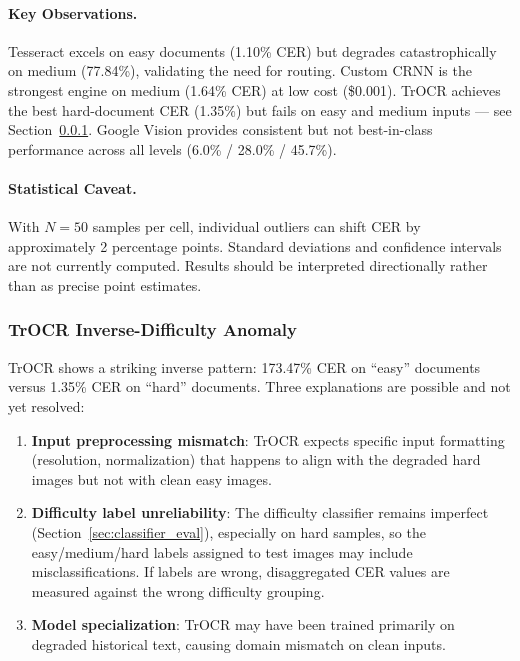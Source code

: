 \documentclass[12pt,a4paper]{article}
\begin{document}
\paragraph{Key Observations.}
Tesseract excels on easy documents (1.10\% CER) but degrades
catastrophically on medium (77.84\%), validating the need for
routing. Custom CRNN is the strongest engine on medium (1.64\% CER)
at low cost (\$0.001). TrOCR achieves the best hard-document CER
(1.35\%) but fails on easy and medium inputs --- see
Section~\ref{sec:trocr_anomaly}. Google Vision provides consistent
but not best-in-class performance across all levels (6.0\% / 28.0\%
/ 45.7\%).

\paragraph{Statistical Caveat.}
With $N=50$ samples per cell, individual outliers can shift CER by
approximately 2 percentage points. Standard deviations and confidence
intervals are not currently computed. Results should be interpreted
directionally rather than as precise point estimates.

\subsubsection{TrOCR Inverse-Difficulty Anomaly}
\label{sec:trocr_anomaly}

TrOCR shows a striking inverse pattern: 173.47\% CER on ``easy''
documents versus 1.35\% CER on ``hard'' documents. Three
explanations are possible and not yet resolved:

\begin{enumerate}
  \item \textbf{Input preprocessing mismatch}: TrOCR expects specific
    input formatting (resolution, normalization) that happens to
    align with the degraded hard images but not with clean easy
    images.
  \item \textbf{Difficulty label unreliability}: The difficulty
    classifier remains imperfect (Section~\ref{sec:classifier_eval}),
    especially on hard samples, so the easy/medium/hard labels
    assigned to test images may include misclassifications. If labels
    are wrong, disaggregated CER values are measured against the wrong
    difficulty grouping.
  \item \textbf{Model specialization}: TrOCR may have been trained
    primarily on degraded historical text, causing domain mismatch
    on clean inputs.
\end{enumerate}
\end{document}
